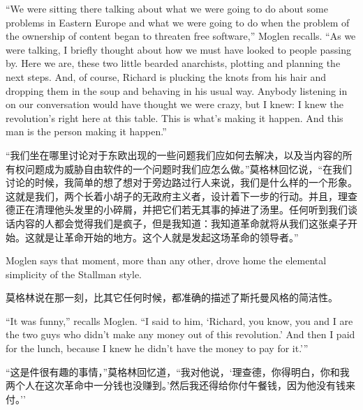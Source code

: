 \ifdefined\eng
``We were sitting there talking about what we were going to do about some problems in Eastern Europe and what we were going to do when the problem of the ownership of content began to threaten free software,'' Moglen recalls. ``As we were talking, I briefly thought about how we must have looked to people passing by. Here we are, these two little bearded anarchists, plotting and planning the next steps. And, of course, Richard is plucking the knots from his hair and dropping them in the soup and behaving in his usual way. Anybody listening in on our conversation would have thought we were crazy, but I knew: I knew the revolution's right here at this table. This is what's making it happen. And this man is the person making it happen.''
\fi

\ifdefined\chs
``我们坐在哪里讨论对于东欧出现的一些问题我们应如何去解决，以及当内容的所有权问题成为威胁自由软件的一个问题时我们应怎么做。''莫格林回忆说，``在我们讨论的时候，我简单的想了想对于旁边路过行人来说，我们是什么样的一个形象。这就是我们，两个长着小胡子的无政府主义者，设计着下一步的行动。并且，理查德正在清理他头发里的小碎屑，并把它们若无其事的掉进了汤里。任何听到我们谈话内容的人都会觉得我们是疯子，但是我知道：我知道革命就将从我们这张桌子开始。这就是让革命开始的地方。这个人就是发起这场革命的领导者。''
\fi

\ifdefined\eng
Moglen says that moment, more than any other, drove home the elemental simplicity of the Stallman style.
\fi

\ifdefined\chs
莫格林说在那一刻，比其它任何时候，都准确的描述了斯托曼风格的简洁性。
\fi

\ifdefined\eng
``It was funny,'' recalls Moglen. ``I said to him, `Richard, you know, you and I are the two guys who didn't make any money out of this revolution.' And then I paid for the lunch, because I knew he didn't have the money to pay for it.'\hspace{0.01in}''%
\fi

\ifdefined\chs
``这是件很有趣的事情，''莫格林回忆道，``我对他说，`理查德，你得明白，你和我两个人在这次革命中一分钱也没赚到。'然后我还得给你付午餐钱，因为他没有钱来付。'' %
\fi

\theendnotes
\setcounter{endnote}{0}

